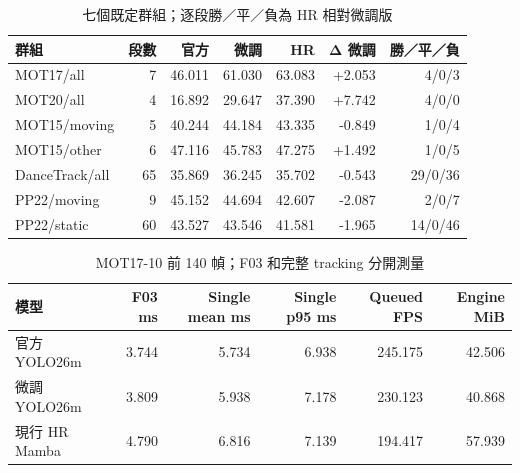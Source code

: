 \begin{table}[H]
\caption{七個既定群組；逐段勝／平／負為 HR 相對微調版}
\small
\noindent\begin{tabularx}{\textwidth}{@{}Yrrrrrr@{}}
\toprule
群組 & 段數 & 官方 & 微調 & HR & Δ 微調 & 勝／平／負 \\
\midrule
MOT17/all & 7 & 46.011 & 61.030 & 63.083 & +2.053 & 4/0/3 \\
MOT20/all & 4 & 16.892 & 29.647 & 37.390 & +7.742 & 4/0/0 \\
MOT15/moving & 5 & 40.244 & 44.184 & 43.335 & -0.849 & 1/0/4 \\
MOT15/other & 6 & 47.116 & 45.783 & 47.275 & +1.492 & 1/0/5 \\
DanceTrack/all & 65 & 35.869 & 36.245 & 35.702 & -0.543 & 29/0/36 \\
PP22/moving & 9 & 45.152 & 44.694 & 42.607 & -2.087 & 2/0/7 \\
PP22/static & 60 & 43.527 & 43.546 & 41.581 & -1.965 & 14/0/46 \\
\bottomrule
\end{tabularx}
\end{table}
\begin{table}[H]
\caption{MOT17-10 前 140 幀；F03 和完整 tracking 分開測量}
\small
\noindent\begin{tabularx}{\textwidth}{@{}Yrrrrr@{}}
\toprule
模型 & F03 ms & Single mean ms & Single p95 ms & Queued FPS & Engine MiB \\
\midrule
官方 YOLO26m & 3.744 & 5.734 & 6.938 & 245.175 & 42.506 \\
微調 YOLO26m & 3.809 & 5.938 & 7.178 & 230.123 & 40.868 \\
現行 HR Mamba & 4.790 & 6.816 & 7.139 & 194.417 & 57.939 \\
\bottomrule
\end{tabularx}
\end{table}

